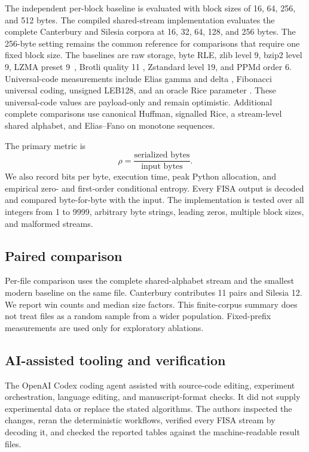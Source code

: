 \documentclass[a4paper,fleqn]{cas-dc}
\begin{document}
The independent per-block baseline is evaluated with block sizes of 16, 64,
256, and 512 bytes. The compiled shared-stream implementation evaluates the
complete Canterbury and Silesia corpora at 16, 32, 64, 128, and 256 bytes.
The 256-byte setting remains the common reference for comparisons that require
one fixed block size. The baselines
are raw storage, byte RLE, zlib level 9, bzip2
level 9, LZMA preset 9~\cite{Pavlov2015LZMA}, Brotli quality 11
\cite{Alakuijala2016Brotli}, Zstandard level 19, and PPMd order 6.
Universal-code measurements include Elias gamma and delta
\cite{Elias1975}, Fibonacci universal coding, unsigned LEB128, and an oracle
Rice parameter \cite{Golomb1966,RicePlaunt1971}. These universal-code values
are payload-only and remain optimistic. Additional complete comparisons
use canonical Huffman, signalled Rice, a stream-level shared alphabet, and
Elias--Fano on monotone sequences.

The primary metric is
\begin{equation}
\rho=\frac{\text{serialized bytes}}{\text{input bytes}}.
\end{equation}
We also record bits per byte, execution time, peak Python allocation, and
empirical zero- and first-order conditional entropy. Every FISA output is
decoded and compared byte-for-byte with the input. The implementation is
tested over all integers from 1 to 9999, arbitrary byte strings, leading
zeros, multiple block sizes, and malformed streams.

\subsection{Paired comparison}

Per-file comparison uses the complete shared-alphabet stream and the smallest
modern baseline on the same file. Canterbury contributes 11 pairs and Silesia
12. We report win counts and median size factors. This finite-corpus summary
does not treat files as a random sample from a wider population. Fixed-prefix
measurements are used only for exploratory ablations.

\subsection{AI-assisted tooling and verification}

The OpenAI Codex coding agent assisted with source-code editing, experiment orchestration,
language editing, and manuscript-format checks. It did not supply experimental
data or replace the stated algorithms. The authors inspected the changes,
reran the deterministic workflows, verified every FISA stream by decoding it,
and checked the reported tables against the machine-readable result files.
\end{document}
